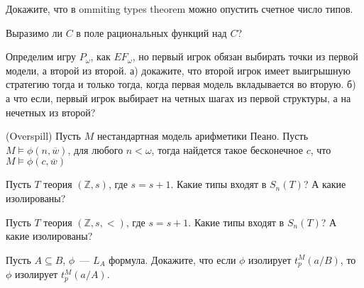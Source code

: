 \setcounter{curtask}{27}


\begin{task}
    Докажите, что в ommiting types theorem можно опустить счетное число типов.
\end{task}

\breakline


\begin{ptask}{12}
    Выразимо ли $C$ в поле рациональных функций над $C$?
\end{ptask}

\begin{ptask}{17}
    Определим игру $P_{\omega}$, как $EF_{\omega}$, но первый игрок обязан выбирать
    точки из первой модели, а второй из второй.
	а) докажите, что второй игрок имеет выигрышную стратегию тогда и только тогда,
    когда первая модель вкладывается во вторую.
    б) а что если, первый игрок выбирает на четных шагах из первой структуры, а на
    нечетных из второй?
\end{ptask}

\begin{ptask}{19}(Overspill)
    Пусть $M$ нестандартная модель арифметики Пеано. Пусть
    $M \models \phi(n, \overline{w})$, для любого $n < \omega$, тогда найдется такое
    бесконечное $c$, что $M \models \phi(c, \overline{w})$
\end{ptask}

\begin{ptask}{24}
    Пусть $T$ теория $(\mathbb{Z}, s)$, где $s = s + 1$. Какие типы входят в
    $S_n(T)$? А какие изолированы?
\end{ptask}

\begin{ptask}{25}
    Пусть $T$ теория $(\mathbb{Z}, s, <)$, где $s = s + 1$. Какие типы входят в
    $S_n(T)$? А какие изолированы?
\end{ptask}

\begin{ptask}{26}
    Пусть $A \subseteq B$, $\phi$~--- $L_A$ формула. Докажите, что если $\phi$
    изолирует $t_p^M(a/B)$, то $\phi$ изолирует $t_p^M(a/A)$.
\end{ptask}